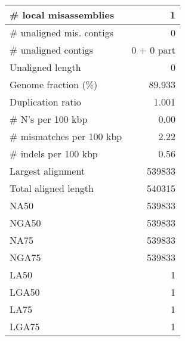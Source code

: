\documentclass[12pt,a4paper]{article}
\begin{document}
\begin{table}[ht]
\begin{center}
\begin{tabular}{|l*{1}{|r}|}
\# local misassemblies & 1 \\ \hline
\# unaligned mis. contigs & 0 \\ \hline
\# unaligned contigs & 0 + 0 part \\ \hline
Unaligned length & 0 \\ \hline
Genome fraction (\%) & 89.933 \\ \hline
Duplication ratio & 1.001 \\ \hline
\# N's per 100 kbp & 0.00 \\ \hline
\# mismatches per 100 kbp & 2.22 \\ \hline
\# indels per 100 kbp & 0.56 \\ \hline
Largest alignment & 539833 \\ \hline
Total aligned length & 540315 \\ \hline
NA50 & 539833 \\ \hline
NGA50 & 539833 \\ \hline
NA75 & 539833 \\ \hline
NGA75 & 539833 \\ \hline
LA50 & 1 \\ \hline
LGA50 & 1 \\ \hline
LA75 & 1 \\ \hline
LGA75 & 1 \\ \hline
\end{tabular}
\end{center}
\end{table}
\end{document}
